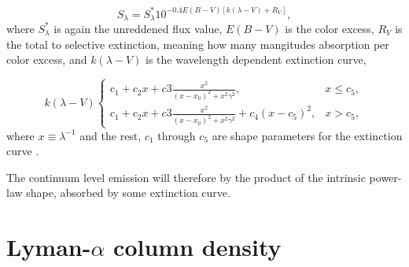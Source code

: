 \documentclass[a4paper,fleqn,usenatbib]{mnras}
\begin{document}
\begin{equation} 
S_\lambda = S_\lambda^*   10 ^{-0.4 E(B-V)[k(\lambda - V) + R_V]},
\end{equation}
where $S_\lambda^*$ is again the unreddened flux value, $E(B-V)$ is the color excess, $R_V$ is the total to selective extinction, meaning how many mangitudes absorption per color excess, and $k(\lambda - V)$ is the wavelength dependent extinction curve,

\begin{equation} 
k(\lambda - V)
\begin{cases}
c_1 + c_2 x + c3 \frac{x^2}{(x - x_0)^2 + x^2 \gamma^2},&  x\leq c_5,\\
c_1 + c_2 x + c3 \frac{x^2}{(x - x_0)^2 + x^2 \gamma^2} + c_4(x - c_5)^2, &  x > c_5,
\end{cases}
\end{equation}
where $x \equiv \lambda^{-1}$ and the rest, $c_1$ through $c_5$ are shape parameters for the extinction curve \citep{Fitzpatrick2007}. 

The continuum level emission will therefore by the product of the intrinsic power-law shape, absorbed by some extinction curve. 



\section{Lyman-$\alpha$ column density} \label{app_absorp}
\end{document}
